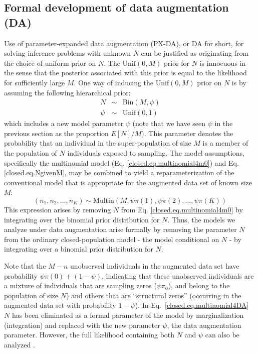 \subsection{Formal development of data augmentation (DA) }

Use of parameter-expanded data augmentation (PX-DA), or DA for short, for solving inference problems with unknown $N$ can be
justified as originating from the choice of uniform prior on $N$.  The
$\mathrm{Unif}(0,M)$ prior for $N$ is innocuous in the sense that the
posterior associated with this prior is equal to the likelihood for
sufficiently large $M$.  One way of inducing the $\mathrm{Unif}(0,M)$
prior on $N$ is by assuming the following hierarchical prior:
\begin{eqnarray}
\label{closed.eq.NgivenM}
  N &\sim& \mathrm{Bin}(M, \psi) \\ \nonumber
  \psi &\sim& \mathrm{Unif}(0,1)
\end{eqnarray}
which includes a new model parameter $\psi$ 
(note that we have seen $\psi$ in the previous section as the proportion $E[N]/M$). 
This parameter denotes
the probability that an individual in the super-population of size $M$
is a member of the population of $N$ individuals exposed to sampling.
The model assumptions, specifically the multinomial model 
(Eq. \ref{closed.eq.multinomial4m0})
and Eq. \ref{closed.eq.NgivenM}, may be combined to yield a
reparameterization of the conventional model that is appropriate for
the augmented data set of known size $M$:
\begin{equation}
\label{closed.eq.multinomial4DA}
    (n_1, n_2, \ldots, n_K) \sim \mathrm{Multin}(M, \psi  \pi(1), \psi \pi(2), \ldots, \psi \pi(K))
\end{equation}
This expression arises by removing $N$ from Eq. \ref{closed.eq.multinomial4m0} by 
integrating
over the binomial prior distribution for $N$. Thus, the models we
analyze under data augmentation arise formally by removing the
parameter $N$ from the ordinary closed-population model - the model conditional on $N$ -
by integrating over a binomial prior distribution for $N$.

Note that the $M-n$ unobserved individuals in the augmented data set
have probability $\psi \pi(0) + (1-\psi)$, indicating that these
unobserved individuals are a mixture of individuals that are sampling
zeros ($\psi \pi_0$), and belong to the population of size $N$) and
others that are ``structural zeros'' (occurring in the augmented data
set with probability $1 - \psi$). In Eq.~\ref{closed.eq.multinomial4DA} $N$
has been eliminated as a formal parameter of the model by
marginalization (integration) and replaced with the new parameter
$\psi$, the data augmentation parameter.
However, the full likelihood containing both $N$ and $\psi$ can also be
analyzed \citep[see][]{royle_etal:2007}.


